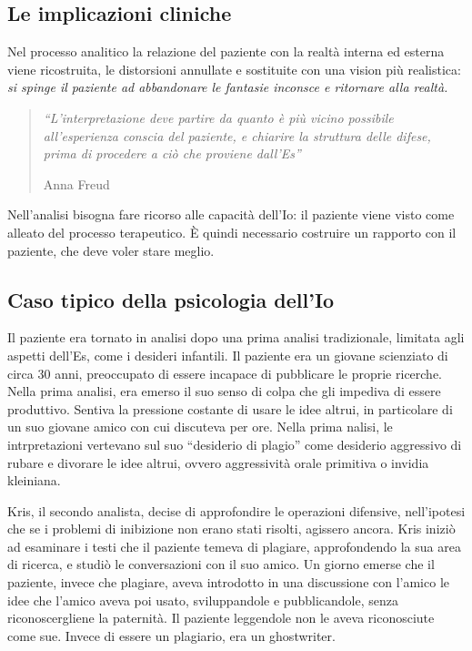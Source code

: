 \documentclass[12pt, a4paper]{article}
\begin{document}
\subsection{Le implicazioni cliniche}

Nel processo analitico la relazione del paziente con la realt\`a interna ed esterna viene ricostruita, le distorsioni annullate e sostituite con una vision pi\`u realistica: \emph{si spinge il paziente ad abbandonare le fantasie inconsce e ritornare alla realt\`a.}

\begin{quote}
    \emph{``L'interpretazione deve partire da quanto \`e pi\`u vicino possibile all'esperienza conscia del paziente, e chiarire la struttura delle difese, prima di procedere a ciò che proviene dall'Es''}
    \begin{flushright}
        Anna Freud
    \end{flushright}
\end{quote}

Nell'analisi bisogna fare ricorso alle capacit\`a dell'Io: il paziente viene visto come alleato del processo terapeutico.  
\`E quindi necessario costruire un rapporto con il paziente, che deve voler stare meglio.

\subsection{Caso tipico della psicologia dell'Io}

Il paziente era tornato in analisi dopo una prima analisi tradizionale, limitata agli aspetti dell'Es, come i desideri infantili.
Il paziente era un giovane scienziato di circa 30 anni, preoccupato di essere incapace di pubblicare le proprie ricerche. Nella prima analisi, era emerso il suo senso di colpa che gli impediva di essere produttivo. Sentiva la pressione costante di usare le idee altrui, in particolare di un suo giovane amico con cui discuteva per ore. Nella prima nalisi, le intrpretazioni vertevano sul suo ``desiderio di plagio'' come desiderio aggressivo di rubare e divorare le idee altrui, ovvero
aggressivit\`a orale primitiva o invidia kleiniana.

Kris, il secondo analista, decise di approfondire le operazioni difensive, nell'ipotesi che se i problemi di inibizione non erano stati risolti, agissero ancora. Kris iniziò ad esaminare i testi che il paziente temeva di plagiare, approfondendo la sua area di ricerca, e studiò le conversazioni con il suo amico. Un giorno emerse che il paziente, invece che plagiare, aveva introdotto in una discussione con l'amico le idee che l'amico aveva poi usato, sviluppandole e
pubblicandole, senza riconoscergliene la paternit\`a. Il paziente leggendole non le aveva riconosciute come sue. Invece di essere un plagiario, era un ghostwriter.  
\end{document}
